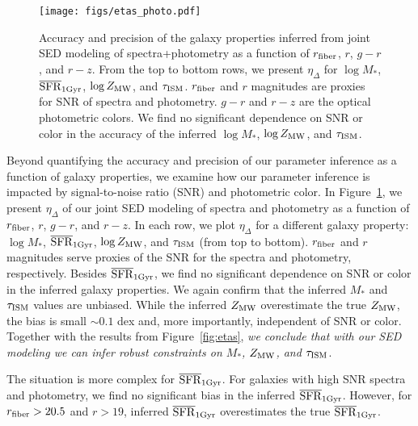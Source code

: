 \begin{figure}
\begin{center}
    \texttt{[image: figs/etas\_photo.pdf]}
    \caption{
        Accuracy and precision of the galaxy properties inferred from joint SED
        modeling of spectra+photometry as a function of $r_{\rm fiber}$, $r$,
        $g-r$, and $r-z$.
        From the top to bottom rows, we present $\eta_\Delta$ for $\log M_*$,
        $\overline{\rm SFR}_{\rm 1Gyr}$, $\log Z_{\rm MW}$, and $\tau_{\rm ISM}$.
        $r_{\rm fiber}$ and $r$ magnitudes are proxies for SNR of spectra and
        photometry. 
        $g-r$ and $r-z$ are the optical photometric colors. 
        We find no significant dependence on SNR or color in the accuracy of
        the inferred $\log M_*$, $\log Z_{\rm MW}$, and $\tau_{\rm ISM}$. 
    } 
    \label{fig:systematics}
\end{center}
\end{figure}


Beyond quantifying the accuracy and precision of our parameter inference as a
function of galaxy properties, we examine how our parameter inference is
impacted by signal-to-noise ratio (SNR) and photometric color. 
In Figure~\ref{fig:systematics}, we present $\eta_\Delta$ of our joint
SED modeling of spectra and photometry as a function of $r_{\rm fiber}$, $r$,
$g-r$, and $r-z$. 
In each row, we plot $\eta_\Delta$ for a different galaxy property: $\log M_*$,
$\overline{\rm SFR}_{\rm 1Gyr}$, $\log Z_{\rm MW}$, and $\tau_{\rm ISM}$ (from top to bottom).
$r_{\rm fiber}$ and $r$ magnitudes serve proxies of the SNR for the spectra and
photometry, respectively. 
Besides $\overline{\rm SFR}_{\rm 1Gyr}$, we find no significant dependence on SNR or color in the
inferred galaxy properties. 
We again confirm that the inferred $M_*$ and $\tau_{\rm ISM}$ values are
unbiased.
While the inferred $Z_{\rm MW}$ overestimate the true $Z_{\rm MW}$, the bias is
small $\sim 0.1$ dex and, more importantly, independent of SNR or color. 
Together with the results from Figure~\ref{fig:etas}, \emph{we conclude that with our
SED modeling we can infer robust constraints on $M_*$, $Z_{\rm MW}$, and
$\tau_{\rm ISM}$}.

The situation is more complex for $\overline{\rm SFR}_{\rm 1Gyr}$. 
For galaxies with high SNR spectra and photometry, we find no significant bias
in the inferred $\overline{\rm SFR}_{\rm 1Gyr}$. 
However, for $r_{\rm fiber} > 20.5$ and $r > 19$, inferred $\overline{\rm SFR}_{\rm 1Gyr}$
overestimates the true $\overline{\rm SFR}_{\rm 1Gyr}$. 
